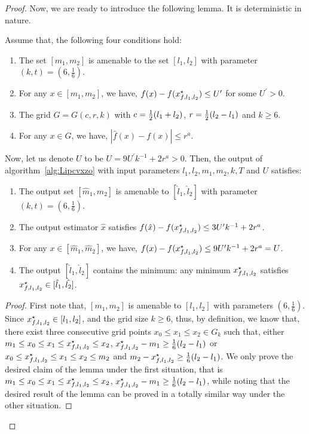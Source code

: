 \begin{proof}
Now, we are ready to introduce the following lemma. It is deterministic in nature. 
\begin{lemma}
\label{lemma:crucial-one-dim-zo-ns}
 Assume that, the following four conditions hold: 
\begin{enumerate}
\item The set $[m_1, m_2]$ is amenable to the set $[l_1, l_2]$ with parameter $(k, t) = \left(6, \frac{1}{6}\right)$.
\item For any $x \in [m_1, m_2]$, we have, $f(x) - f(x_{f, l_1, l_2}^\star) \leq U^\prime$ for some $U^\prime > 0$.
\item The grid $G = G(c, r, k)$ with $c = \frac{1}{2}(l_1 + l_2)$, $r = \frac{1}{2}(l_2 - l_1)$ and $k \geq 6$.
\item For any $x\in G$, we have, $|\hat{f}(x) - f(x)| \leq r^a$. 
\end{enumerate}
Now, let us denote $U$ to be $U =9U^\prime k^{-1} + 2r^a > 0$. Then, the output of 
algorithm~\ref{alg:Lipcvxzo} with input parameters $l_1, l_2, m_1, m_2, k, T$ 
and $U$ satisfies: 
\begin{enumerate}
\item The output set $[\hat{m}_1, \hat{m}_2]$ is amenable to  
	$[\hat{l}_1, \hat{l}_2]$ with parameter $(k, t) = \left(6, \frac{1}{6}\right)$.
\item The output estimator $\hat{x}$ satisfies $f(\hat{x}) - f(x_{f, l_1, l_2}^\star)
	\leq 3U^\prime k^{-1} + 2r^a$. 
\item For any $x \in [\hat{m}_1, \hat{m}_2]$, we have, 
	$f(x) - f(x_{f, l_1, l_2}^\star) \leq 9 U^\prime k^{-1} + 2r^a = U$. 
\item The output $[\hat{l}_1, \hat{l}_2]$ contains the minimum:
	 any minimum $x_{f, l_1, l_2}^\star$ satisfies $x_{f, l_1, l_2}^\star \in [\hat{l}_1, \hat{l_2}]$. 
\end{enumerate} 
\end{lemma}
\begin{proof}
First note that, $[m_1, m_2]$ is amenable to $[l_1, l_2]$ with parameters $(6, \frac{1}{6})$.
Since $x_{f, l_1, l_2}^\star \in [l_1, l_2]$, and the grid size $k \geq 6$, thus, by definition, 
we know that, there exist three consecutive grid points $x_0 \leq x_1 \leq x_2 \in G_k$ such 
that, either $m_1 \leq x_0 \leq x_1 \leq x_{f, l_1, l_2}^\star \leq x_2$, $x_{f, l_1, l_2}^\star -m_1 \geq 
\frac{1}{6}(l_2 - l_1)$ or $x_0 \leq x_{f, l_1, l_2}^\star \leq x_1 \leq x_2 \leq m_2$ and 
$m_2 - x_{f, l_1, l_2}^\star \geq \frac{1}{6}(l_2-l_1)$. We only prove the desired claim of the 
lemma under the first situation, that is $m_1 \leq x_0 \leq x_1 \leq x_{f, l_1, l_2}^\star \leq x_2$, 
$x_{f, l_1, l_2}^\star -m_1 \geq \frac{1}{6}(l_2 - l_1)$, while noting that the desired result 
of the lemma can be proved in a totally similar way under the other situation. 


\end{proof}
\end{proof}
